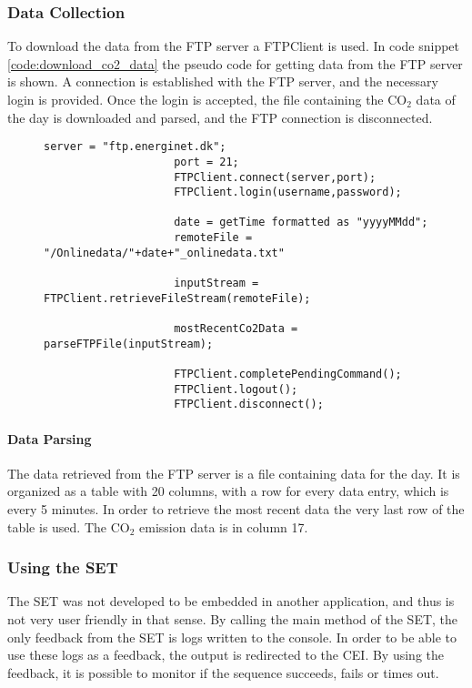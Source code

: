 \documentclass[Main]{subfiles}
\begin{document}
		\subsubsection{Data Collection}
		\label{sub:data_collection}
			To download the data from the FTP server a FTPClient\cite{FTPClient:Online} is used. 
			In code snippet \ref{code:download_co2_data} the pseudo code for getting data from the FTP server is shown. 
			A connection is established with the FTP server, and the necessary login is provided.
			Once the login is accepted, the file containing the CO$_2$ data of the day is downloaded and parsed, and the FTP connection is disconnected.

			\begin{figure}[H]
				\begin{lstlisting}[caption=Download CO2 data, style=Code-C, label=code:download_co2_data]
					server = "ftp.energinet.dk";
	        		port = 21;
					FTPClient.connect(server,port);
					FTPClient.login(username,password);

					date = getTime formatted as "yyyyMMdd";
					remoteFile = "/Onlinedata/"+date+"_onlinedata.txt"

					inputStream = FTPClient.retrieveFileStream(remoteFile);

					mostRecentCo2Data = parseFTPFile(inputStream);

					FTPClient.completePendingCommand();
					FTPClient.logout();
					FTPClient.disconnect();
				\end{lstlisting}
			\end{figure}


			\paragraph{Data Parsing} %
			\label{par:data_parsing}
				The data retrieved from the FTP server is a file containing data for the day. 
				It is organized as a table with 20 columns, with a row for every data entry, which is every 5 minutes.
				In order to retrieve the most recent data the very last row of the table is used.
				The CO$_2$ emission data is in column 17.

		\subsubsection{Using the SET} %
		\label{sub:using_sequence_executor_tool}
			The SET was not developed to be embedded in another application, and thus is not very user friendly in that sense.
			By calling the main method of the SET, the only feedback from the SET is logs written to the console. 
			In order to be able to use these logs as a feedback, the output is redirected to the CEI.
			By using the feedback, it is possible to monitor if the sequence succeeds, fails or times out.
\end{document}
